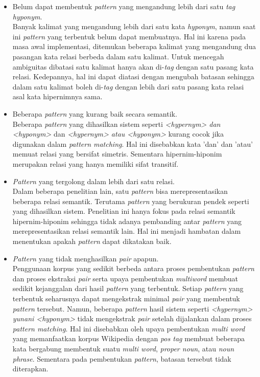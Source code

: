 \begin{itemize}
  \item Belum dapat membentuk \textit{pattern} yang mengandung lebih dari satu \textit{tag hyponym}. \\
  Banyak kalimat yang mengandung lebih dari satu kata \textit{hyponym}, namun saat ini \textit{pattern} yang terbentuk belum dapat membuatnya. Hal ini karena pada masa awal implementasi, ditemukan beberapa kalimat yang mengandung dua pasangan kata relasi berbeda dalam satu kalimat. Untuk mencegah ambiguitas dibatasi satu kalimat hanya akan di-\textit{tag} dengan satu pasang kata relasi. Kedepannya, hal ini dapat diatasi dengan mengubah batasan sehingga dalam satu kalimat boleh di-\textit{tag} dengan lebih dari satu pasang kata relasi asal kata hipernimnya sama. 
  \item Beberapa \textit{pattern} yang kurang baik secara semantik. \\
  Beberapa \textit{pattern} yang dihasilkan sistem seperti \textit{<hypernym> dan <hyponym>} dan  \textit{<hypernym> atau <hyponym>} kurang cocok jika digunakan dalam \textit{pattern matching}. Hal ini disebabkan kata 'dan' dan 'atau' memuat relasi yang bersifat simetris. Sementara hipernim-hiponim merupakan relasi yang hanya memiliki sifat transitif.
  \item \textit{Pattern} yang tergolong dalam lebih dari satu relasi. \\
  Dalam beberapa penelitian lain, satu \textit{pattern} bisa merepresentasikan beberapa relasi semantik. Terutama \textit{pattern} yang berukuran pendek seperti yang dihasilkan sistem. Penelitian ini hanya fokus pada relasi semantik hipernim-hiponim sehingga tidak adanya pembanding antar \textit{pattern} yang merepresentasikan relasi semantik lain. Hal ini menjadi hambatan dalam menentukan apakah \textit{pattern} dapat dikatakan baik.
  \item \textit{Pattern} yang tidak menghasilkan \textit{pair} apapun. \\
  Penggunaan korpus yang sedikit berbeda antara proses pembentukan \textit{pattern} dan proses ekstraksi \textit{pair} serta upaya pembentukan \textit{multiword} membuat sedikit kejanggalan dari hasil \textit{pattern} yang terbentuk. Setiap \textit{pattern} yang terbentuk seharusnya dapat mengekstrak minimal \textit{pair} yang membentuk \textit{pattern} tersebut. Namun, beberapa \textit{pattern} hasil sistem seperti \textit{<hypernym> yunani <hyponym>} tidak mengekstrak \textit{pair} setelah dijalankan dalam proses \textit{pattern matching}. Hal ini disebabkan oleh upaya pembentukan \textit{multi word} yang memanfaatkan korpus Wikipedia dengan \textit{pos tag} membuat beberapa kata bergabung membentuk suatu \textit{multi word}, \textit{proper noun}, atau \textit{noun phrase}. Sementara pada pembentukan \textit{pattern}, batasan tersebut tidak diterapkan.
\end{itemize}

